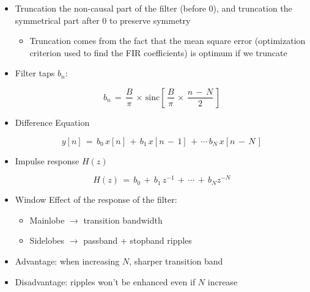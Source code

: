 \documentclass[12pt,a4paper]{book}
\begin{document}
\begin{itemize}

\item Truncation the non-causal part of the filter (before 0), and truncation the symmetrical part after 0 to preserve symmetry

    \begin{itemize}
        \item Truncation comes from the fact that the mean square error (optimization criterion used to find the FIR coefficients) is optimum if we truncate
    \end{itemize}


\item Filter taps $b_n$:

\begin{equation}
    b_n \, = \, \displaystyle\frac{B}{\pi} \, \times \, \text{sinc}\left[\, \frac{B}{\pi} \, \times \, \frac{n \, - \, N}{2}    \,\right]
\end{equation}

\item Difference Equation

\begin{equation}
    y[n] \, = \, b_0 \, x[n] \, + \, b_1 \, x[n \, - \, 1] \, + \, \cdots \, b_{N} \, x[n \, - \, N \, ]
\end{equation}

\item Impulse response $H(z)$

\begin{equation}
    H(z) \, = \, b_0 \, + \, b_1 \, z^{-1} \, + \, \cdots \, + \, b_N z^{-N}
\end{equation}


\item Window Effect of the response of the filter:

    \begin{itemize}
        \item Mainlobe $\rightarrow$ transition bandwidth
        
        \item Sidelobes $\rightarrow$ passband + stopband ripples
    \end{itemize}



\item Advantage: when increasing $N$, sharper transition band

\item Disadvantage: ripples won't be enhanced even if $N$ increase



\end{itemize}
\end{document}
